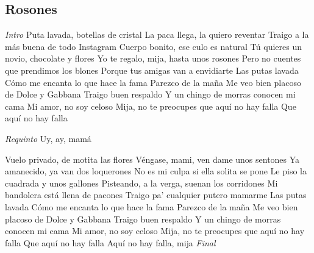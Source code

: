 \subsection{Rosones}
\noindent

\vspace{1cm}

\begin{guitar}
	\begin{multicols}{2}
		\textit{Intro}
	Puta lavada, botellas de cristal
	La paca llega, la quiero reventar
	Traigo a la más buena de todo Instagram
	Cuerpo bonito, ese culo es natural
	Tú quieres un novio, chocolate y flores
	Yo te regalo, mija, hasta unos rosones
	Pero no cuentes que prendimos los blones
	Porque tus amigas van a envidiarte
	Las putas lavada
	Cómo me encanta lo que hace la fama
	Parezco de la maña
	Me veo bien placoso de Dolce y Gabbana
	Traigo buen respaldo
	Y un chingo de morras conocen mi cama
	Mi amor, no soy celoso
	Mija, no te preocupes que aquí no hay falla
	Que aquí no hay falla

	\par
	\textit{Requinto}
	Uy, ay, mamá
	\par
	Vuelo privado, de motita las flores
	Véngase, mami, ven dame unos sentones
	Ya amanecido, ya van dos loquerones
	No es mi culpa si ella solita se pone
	Le piso la cuadrada y unos gallones
	Pisteando, a la verga, suenan los corridones
	Mi bandolera está llena de pacones
	Traigo pa' cualquier putero mamarme
	Las putas lavada
	Cómo me encanta lo que hace la fama
	Parezco de la maña
	Me veo bien placoso de Dolce y Gabbana
	Traigo buen respaldo
	Y un chingo de morras conocen mi cama
	Mi amor, no soy celoso
	Mija, no te preocupes que aquí no hay falla
	Que aquí no hay falla
	Aquí no hay falla, mija
		\textit{Final}
	\end{multicols}
\end{guitar}
